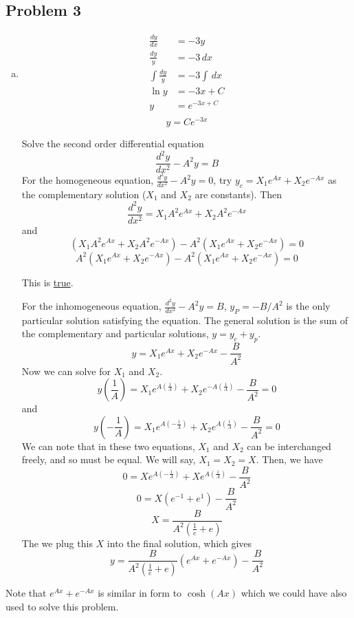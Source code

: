 \documentclass{report}
\begin{document}
\subsection*{Problem 3}
\begin{enumerate}[a)]
\item 
\begin{align}
\frac{dy}{dx}	&= -3y \\
\frac{dy}{y} 	& = -3\,dx \\
\int\frac{dy}{y}&= -3 \int \,dx \\
\ln y			&= -3 x + C \\
y				&= e^{-3x + C} \\
\end{align}
$$\boxed{y = Ce^{-3x}}$$

Solve the second order differential equation
$$ \frac{d^2 y}{dx^2} - A^2y = B $$
For the homogeneous equation, $\frac{d^2 y}{dx^2} - A^2y = 0$, try $y_c = X_1 e^{Ax} + X_2 e^{-Ax}$ as the complementary solution ($X_1$ and $X_2$ are constants). Then
$$ \frac{d^2 y}{dx^2} = X_1 A^2 e^{Ax} + X_2 A^2 e^{-Ax} $$
and
$$ (X_1 A^2 e^{Ax} + X_2 A^2 e^{-Ax}) - A^2(X_1 e^{Ax} + X_2 e^{-Ax}) = 0 $$
$$ A^2 (X_1 e^{Ax} + X_2 e^{-Ax}) - A^2 (X_1 e^{Ax} + X_2 e^{-Ax}) = 0 $$

This is \underline{true}.

For the inhomogeneous equation, $\frac{d^2 y}{dx^2} - A^2y = B$, $y_P = -B/A^2$ is the only particular solution satisfying the equation. The general solution is the sum of the complementary and particular solutions, $y = y_c + y_p$. 
$$ y = X_1 e^{Ax} + X_2 e^{-Ax} - \frac{B}{A^2} $$
Now we can solve for $X_1$ and $X_2$. 
$$ y(\frac{1}{A}) = X_1 e^{A(\frac{1}{A})} + X_2 e^{-A(\frac{1}{A})} - \frac{B}{A^2} = 0 $$
and
$$ y(-\frac{1}{A}) = X_1 e^{A(-\frac{1}{A})} + X_2 e^{A(\frac{1}{A})} - \frac{B}{A^2} = 0 $$
We can note that in these two equations, $X_1$ and $X_2$ can be interchanged freely, and so must be equal. We will say, $X_1 = X_2 = X$. Then, we have
$$ 0 = X e^{A(-\frac{1}{A})} + X e^{A(\frac{1}{A})} - \frac{B}{A^2} $$
$$ 0 = X (e^{-1} + e^{1}) - \frac{B}{A^2} $$
$$ X = \frac{B}{A^2(\frac{1}{e} + e)} $$
The we plug this $X$ into the final solution, which gives
$$ y = \frac{B}{A^2(\frac{1}{e} + e)} (e^{Ax} + e^{-Ax}) - \frac{B}{A^2} $$
\end{enumerate}
Note that $e^{Ax} + e^{-Ax}$ is similar in form to $\cosh(Ax)$ which we could have also used to solve this problem.
\end{document}
